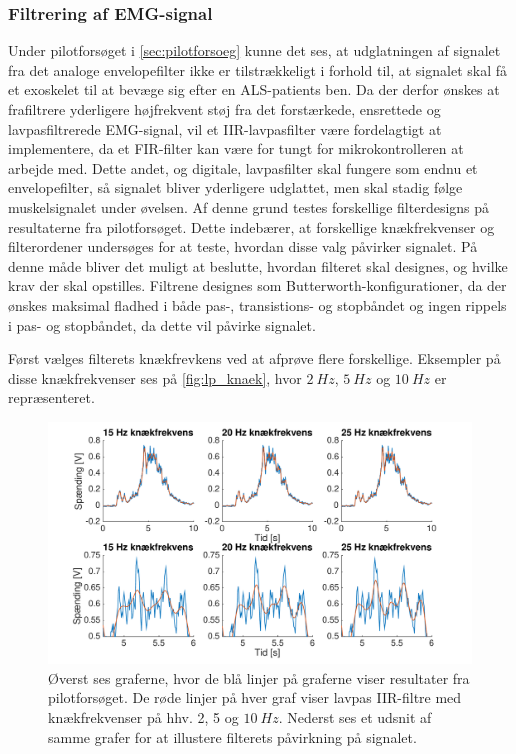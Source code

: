 \subsubsection{Filtrering af EMG-signal} \label{sec:lavpas_krav}
Under pilotforsøget i \autoref{sec:pilotforsoeg} kunne det ses, at udglatningen af signalet fra det analoge envelopefilter ikke er tilstrækkeligt i forhold til, at signalet skal få et exoskelet til at bevæge sig efter en ALS-patients ben. Da der derfor ønskes at frafiltrere yderligere højfrekvent støj fra det forstærkede, ensrettede og lavpasfiltrerede EMG-signal, vil et IIR-lavpasfilter være fordelagtigt at implementere, da et FIR-filter kan være for tungt for mikrokontrolleren at arbejde med. Dette andet, og digitale, lavpasfilter skal fungere som endnu et envelopefilter, så signalet bliver yderligere udglattet, men skal stadig følge muskelsignalet under øvelsen.
Af denne grund testes forskellige filterdesigns på resultaterne fra pilotforsøget. Dette indebærer, at forskellige knækfrekvenser og filterordener undersøges for at teste, hvordan disse valg påvirker signalet. På denne måde bliver det muligt at beslutte, hvordan filteret skal designes, og hvilke krav der skal opstilles. Filtrene designes som Butterworth-konfigurationer, da der ønskes maksimal fladhed i både pas-, transistions- og stopbåndet og ingen rippels i pas- og stopbåndet, da dette vil påvirke signalet.

Først vælges filterets knækfrevkens ved at afprøve flere forskellige. Eksempler på disse knækfrekvenser ses på \autoref{fig:lp_knaek}, hvor $2~Hz$, $5~Hz$ og $10~Hz$ er repræsenteret. 

\begin{figure} [H]
\centering
\includegraphics[width=1.0\textwidth]{figures/problemloesning/lavpas_knaek.pdf}
\caption{Øverst ses graferne, hvor de blå linjer på graferne viser resultater fra pilotforsøget. De røde linjer på hver graf viser lavpas IIR-filtre med knækfrekvenser på hhv. 2, 5 og $10~Hz$. Nederst ses et udsnit af samme grafer for at illustere filterets påvirkning på signalet.}
\label{fig:lp_knaek}
\end{figure} 


